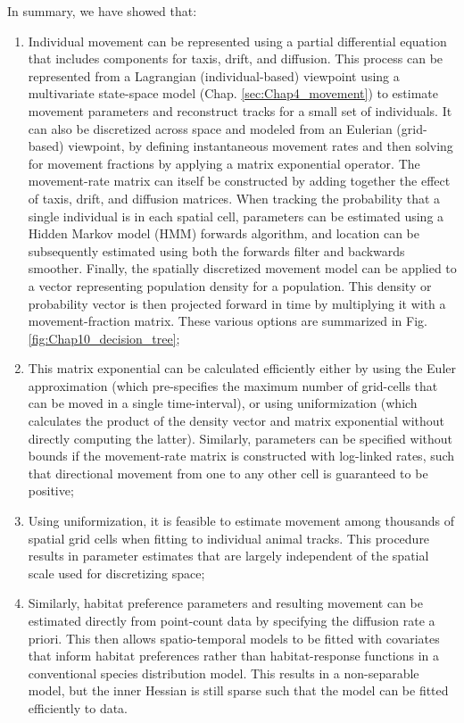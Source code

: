In summary, we have showed that:
\begin{enumerate}
    \item Individual movement can be represented using a partial differential equation that includes components for taxis, drift, and diffusion.  This process can be represented from a Lagrangian (individual-based) viewpoint using a multivariate state-space model (Chap. \ref{sec:Chap4_movement}) to estimate movement parameters and reconstruct tracks for a small set of individuals.  It can also be discretized across space and modeled from an Eulerian (grid-based) viewpoint, by defining instantaneous movement rates and then solving for movement fractions by applying a matrix exponential operator.  The movement-rate matrix can itself be constructed by adding together the effect of taxis, drift, and diffusion matrices.  When tracking the probability that a single individual is in each spatial cell, parameters can be estimated using a Hidden Markov model (HMM) forwards algorithm, and location can be subsequently estimated using both the forwards filter and backwards smoother.  Finally, the spatially discretized movement model can be applied to a vector representing population density for a population.  This density or probability vector is then projected forward in time by multiplying it with a movement-fraction matrix.  These various options are summarized in Fig. \ref{fig:Chap10_decision_tree};

    \item This matrix exponential can be calculated efficiently either by using the Euler approximation (which pre-specifies the maximum number of grid-cells that can be moved in a single time-interval), or using uniformization (which calculates the product of the density vector and matrix exponential without directly computing the latter).  Similarly, parameters can be specified without bounds if the movement-rate matrix is constructed with log-linked rates, such that directional movement from one to any other cell is guaranteed to be positive;  

    \item Using uniformization, it is feasible to estimate movement among thousands of spatial grid cells when fitting to individual animal tracks.  This procedure results in parameter estimates that are largely independent of the spatial scale used for discretizing space;   

    \item Similarly, habitat preference parameters and resulting movement can be estimated directly from point-count data by specifying the diffusion rate a priori.  This then allows spatio-temporal models to be fitted with covariates that inform habitat preferences rather than habitat-response functions in a conventional species distribution model.  This results in a non-separable model, but the inner Hessian is still sparse such that the model can be fitted efficiently to data.  
\end{enumerate}

